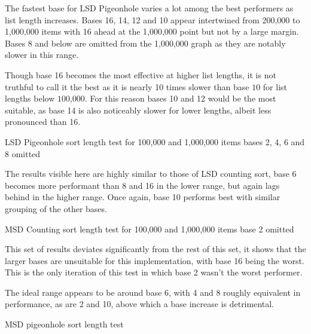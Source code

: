 \documentclass[12pt]{article}
\begin{document}
	The fastest base for LSD Pigeonhole varies a lot among the best performers as list length increases. Bases 16, 14, 12 and 10 appear intertwined from 200,000 to 1,000,000 items with 16 ahead at the 1,000,000 point but not by a large margin. Bases 8 and below are omitted from the 1,000,000 graph as they are notably slower in this range.
	\par
	Though base 16 becomes the most effective at higher list lengths, it is not truthful to call it the best as it is nearly 10 times slower than base $10$ for list lengths below $100$,$000$. For this reason bases 10 and 12 would be the most suitable, as base 14 is also noticeably slower for lower lengths, albeit less pronounced than 16.
	\begin{table}[h]
		\centering
		\captionsetup{type=figure}
			\caption{LSD Pigeonhole sort length test for 100,000 and 1,000,000 items \newline bases 2, 4, 6 and 8 omitted\label{fig:lsdplength}}
		\end{table}
		The results visible here are highly similar to those of LSD counting sort, base 6 becomes more performant than 8 and 16 in the lower range, but again lags behind in the higher range. Once again, base 10 performs best with similar grouping of the other bases.
		\begin{table}[h]
			\centering
			\captionsetup{type=figure}
				\caption{MSD Counting sort length test for 100,000 and 1,000,000 items \newline base 2 omitted\label{fig:msdclength}}
			\end{table}
			\pagebreak
			This set of results deviates significantly from the rest of this set, it shows that the larger bases are unsuitable for this implementation, with base 16 being the worst. This is the only iteration of this test in which base 2 wasn't the worst performer.
			\par
			The ideal range appears to be around base 6, with 4 and 8 roughly equivalent in performance, as are 2 and 10, above which a base increase is detrimental.
			\vspace{-0.5cm}
			\begin{table}[h]
				\captionsetup{type=figure}
				\centering
			\caption{MSD pigeonhole sort length test\label{fig:msdplength}}	
	\end{table}
	\vspace{-1cm}
\end{document}
